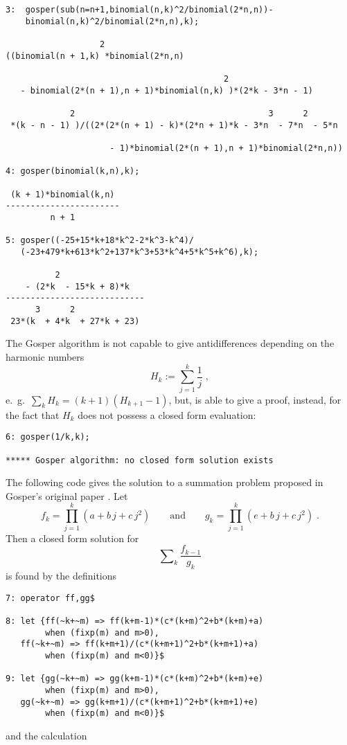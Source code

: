 {\small
\begin{verbatim}
3:  gosper(sub(n=n+1,binomial(n,k)^2/binomial(2*n,n))-
    binomial(n,k)^2/binomial(2*n,n),k);

                   2
((binomial(n + 1,k) *binomial(2*n,n)

                                            2
   - binomial(2*(n + 1),n + 1)*binomial(n,k) )*(2*k - 3*n - 1)

             2                                       3      2
 *(k - n - 1) )/((2*(2*(n + 1) - k)*(2*n + 1)*k - 3*n  - 7*n  - 5*n

                     - 1)*binomial(2*(n + 1),n + 1)*binomial(2*n,n))

4: gosper(binomial(k,n),k);

 (k + 1)*binomial(k,n)
-----------------------
         n + 1

5: gosper((-25+15*k+18*k^2-2*k^3-k^4)/
   (-23+479*k+613*k^2+137*k^3+53*k^4+5*k^5+k^6),k);

          2
    - (2*k  - 15*k + 8)*k
----------------------------
      3      2
 23*(k  + 4*k  + 27*k + 23)
\end{verbatim}
}\noindent
The Gosper algorithm is not capable to give antidifferences depending
on the harmonic numbers
\[
H_k:=\sum_{j=1}^k\frac{1}{j}
\;,
\]
e.\ g.\ $\sum_k H_k=(k+1)(H_{k+1}-1)$, but, is able to give a proof, instead,
for the fact that $H_k$ does not possess a closed form evaluation:

{\small
\begin{verbatim}
6: gosper(1/k,k);

***** Gosper algorithm: no closed form solution exists
\end{verbatim}
}\noindent
The following code gives the solution to a summation problem proposed in
Gosper's original paper \cite{Gos}. Let
\[
f_k=\prod_{j=1}^k (a+b\,j+c\,j^2)
\quad\quad\mbox{and}\quad\quad
g_k=\prod_{j=1}^k (e+b\,j+c\,j^2)
\;.
\]
Then a closed form solution for
\[
\sum\nolimits_k\frac{f_{k-1}}{g_{k}}
\]
is found by the definitions

{\small
\begin{verbatim}
7: operator ff,gg$

8: let {ff(~k+~m) => ff(k+m-1)*(c*(k+m)^2+b*(k+m)+a)
        when (fixp(m) and m>0),
   ff(~k+~m) => ff(k+m+1)/(c*(k+m+1)^2+b*(k+m+1)+a)
        when (fixp(m) and m<0)}$

9: let {gg(~k+~m) => gg(k+m-1)*(c*(k+m)^2+b*(k+m)+e)
        when (fixp(m) and m>0),
   gg(~k+~m) => gg(k+m+1)/(c*(k+m+1)^2+b*(k+m+1)+e)
        when (fixp(m) and m<0)}$
\end{verbatim}
}\noindent
and the calculation

